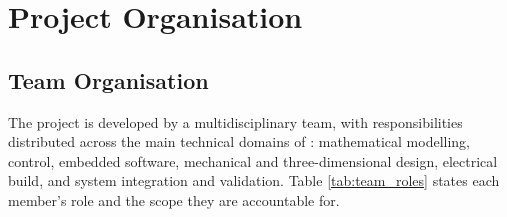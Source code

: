 \section{Project Organisation}

\subsection{Team Organisation}

The project is developed by a multidisciplinary team, with responsibilities
distributed across the main technical domains of \projectname{}: mathematical
modelling, control, embedded software, mechanical and three-dimensional design,
electrical build, and system integration and validation. Table
\ref{tab:team_roles} states each member's role and the scope they are
accountable for.

